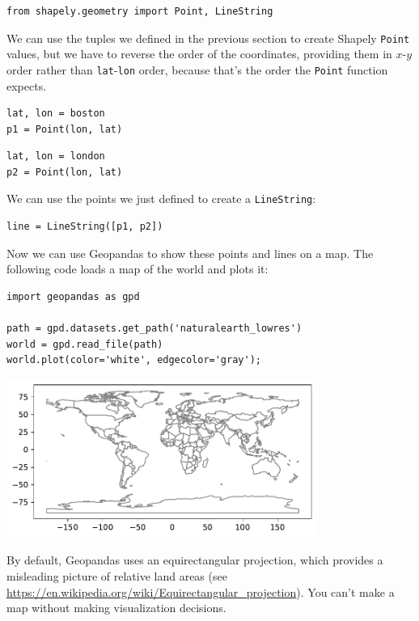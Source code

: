 \begin{lstlisting}[]
from shapely.geometry import Point, LineString
\end{lstlisting}

We can use the tuples we defined in the previous section to create
Shapely \passthrough{\lstinline!Point!} values, but we have to reverse
the order of the coordinates, providing them in \(x\)-\(y\) order rather
than \passthrough{\lstinline!lat!}-\passthrough{\lstinline!lon!} order,
because that's the order the \passthrough{\lstinline!Point!} function
expects.

\begin{lstlisting}[]
lat, lon = boston
p1 = Point(lon, lat)
\end{lstlisting}

\begin{lstlisting}[]
lat, lon = london
p2 = Point(lon, lat)
\end{lstlisting}

We can use the points we just defined to create a
\passthrough{\lstinline!LineString!}:

\begin{lstlisting}[]
line = LineString([p1, p2])
\end{lstlisting}

Now we can use Geopandas to show these points and lines on a map. The
following code loads a map of the world and plots it:

\begin{lstlisting}[]
import geopandas as gpd

path = gpd.datasets.get_path('naturalearth_lowres')
world = gpd.read_file(path)
world.plot(color='white', edgecolor='gray');
\end{lstlisting}

\begin{center}
\includegraphics[width=4in]{chapters/02_times_files/02_times_122_0.pdf}
\end{center}

By default, Geopandas uses an equirectangular projection, which provides
a misleading picture of relative land areas (see
\url{https://en.wikipedia.org/wiki/Equirectangular_projection}). You
can't make a map without making visualization decisions.

